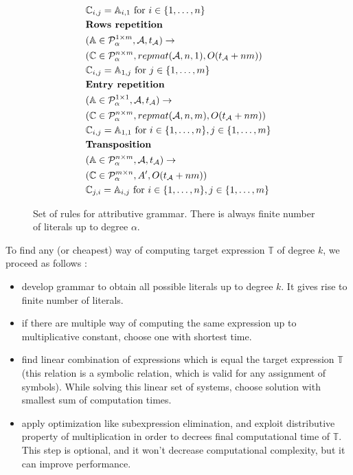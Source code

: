 \documentclass{article}
\begin{document}
\begin{figure}
\begin{framed}
\begin{align*}
&\mathbb{C}_{i, j} = \mathbb{A}_{i, 1} \text{ for } i \in \{1, \dots, n\}\\
&\text{{\bf Rows repetition}}\\
&(\mathbb{A} \in \mathcal{P}^{1 \times m}_\alpha, \mathcal{A}, t_\mathcal{A}) \rightarrow \\ 
&(\mathbb{C} \in \mathcal{P}^{n \times m}_\alpha, repmat(\mathcal{A}, n, 1), O(t_\mathcal{A} + nm)) \\
&\mathbb{C}_{i, j} = \mathbb{A}_{1, j} \text{ for } j \in \{1, \dots, m\}\\
&\text{{\bf Entry repetition}}\\
&(\mathbb{A} \in \mathcal{P}^{1 \times 1}_\alpha, \mathcal{A}, t_\mathcal{A}) \rightarrow \\ 
&(\mathbb{C} \in \mathcal{P}^{n \times m}_\alpha, repmat(\mathcal{A}, n, m), O(t_\mathcal{A} + nm)) \\
&\mathbb{C}_{i, j} = \mathbb{A}_{1, 1} \text{ for } i \in \{1, \dots, n\}, j \in \{1, \dots, m\}\\
&\text{{\bf Transposition}}\\
&(\mathbb{A} \in \mathcal{P}^{n \times m}_\alpha, \mathcal{A}, t_\mathcal{A}) \rightarrow \\ 
&(\mathbb{C} \in \mathcal{P}^{m \times n}_\alpha, A', O(t_\mathcal{A} + nm)) \\
&\mathbb{C}_{j, i} = \mathbb{A}_{i, j} \text{ for } i \in \{1, \dots, n\}, j \in \{1, \dots, m\} \\
\end{align*}
\caption{Set of rules for attributive grammar. There is always finite number of literals up to degree $\alpha$.}
\end{framed}
\label{rules}
\end{figure}


To find any (or cheapest) way of computing target expression $\mathbb{T}$ of degree $k$, we proceed as follows : 
\begin{itemize}
\item develop grammar to obtain all possible literals up to degree $k$. It gives rise to finite number of literals. 
\item if there are multiple way of computing the same expression up to multiplicative constant, choose one with shortest time.
\item find linear combination of expressions which is equal the target expression $\mathbb{T}$ (this relation is a symbolic relation, which is valid for any assignment of symbols). While solving this linear set of systems, choose solution with smallest sum of computation times.
\item apply optimization like subexpression elimination, and exploit distributive property of multiplication in order to decrees final computational time of $\mathbb{T}$. This step is optional, and it won't decrease computational complexity, but it can improve performance.
\end{itemize}
\end{document}
